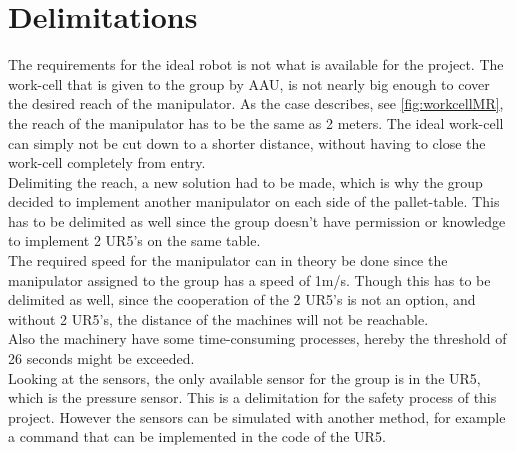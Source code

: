 \chapter{Delimitations} \label{ch:Delimitations}

The requirements for the ideal robot is not what is available for the project. 
The work-cell that is given to the group by AAU, is not nearly big enough to cover the desired reach of the manipulator. As the case describes, see \ref{fig:workcellMR}, the reach of the manipulator has to be the same as 2 meters. The ideal work-cell can simply not be cut down to a shorter distance, without having to close the work-cell completely from entry.\\
Delimiting the reach, a new solution had to be made, which is why the group decided to implement another manipulator on each side of the pallet-table. This has to be delimited as well since the group doesn't have permission or knowledge to implement 2 UR5's on the same table.\\
The required speed for the manipulator can in theory be done since the manipulator assigned to the group has a speed of 1m/s. Though this has to be delimited as well, since the cooperation of the 2 UR5's is not an option, and without 2 UR5's, the distance of the machines will not be reachable.\\
Also the machinery have some time-consuming processes, hereby the threshold of 26 seconds might be exceeded.\\
Looking at the sensors, the only available sensor for the group is in the UR5, which is the pressure sensor. This is a delimitation for the safety process of this project. However the sensors can be simulated with another method, for example a command that can be implemented in the code of the UR5.\\
